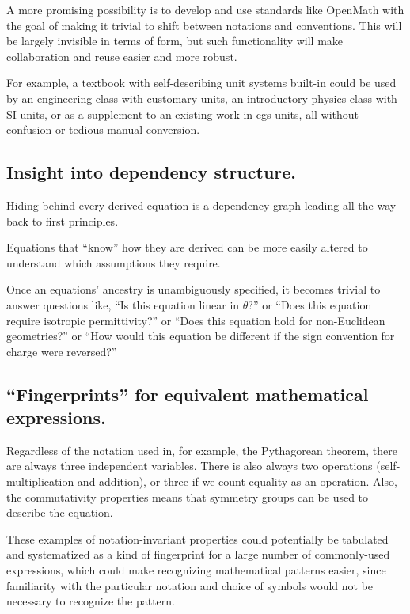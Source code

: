 \documentclass[12pt,letterpaper]{article}
\begin{document}

A more promising possibility is to develop and use standards like OpenMath
with the goal of making it trivial to shift between notations and conventions.
This will be largely invisible in terms of form,
but such functionality will make collaboration and reuse easier and more robust.

For example,
a textbook with self-describing unit systems built-in could be used by
an engineering class with customary units,
an introductory physics class with SI units,
or as a supplement to an existing work in cgs units,
all without confusion or tedious manual conversion.

\subsection{Insight into dependency structure.}

Hiding behind every derived equation is a dependency graph leading all the way back to first principles.

Equations that ``know'' how they are derived can be more easily altered to understand which assumptions they require.

Once an equations' ancestry is unambiguously specified,
it becomes trivial to answer questions like,
``Is this equation linear in $\theta$?''
or
``Does this equation require isotropic permittivity?''
or
``Does this equation hold for non-Euclidean geometries?''
or
``How would this equation be different if the sign convention for charge were reversed?''

\subsection{``Fingerprints'' for equivalent mathematical expressions.}

Regardless of the notation used in,
for example,
the Pythagorean theorem,
there are always three independent variables.
There is also always two operations (self-multiplication and addition),
or three if we count equality as an operation.
Also, the commutativity properties means that symmetry groups can be used to describe the equation.

These examples of notation-invariant properties could potentially be tabulated and systematized
as a kind of fingerprint for a large number of commonly-used expressions,
which could make recognizing mathematical patterns easier,
since familiarity with the particular notation and choice of symbols would not be necessary to recognize the pattern.
\end{document}
